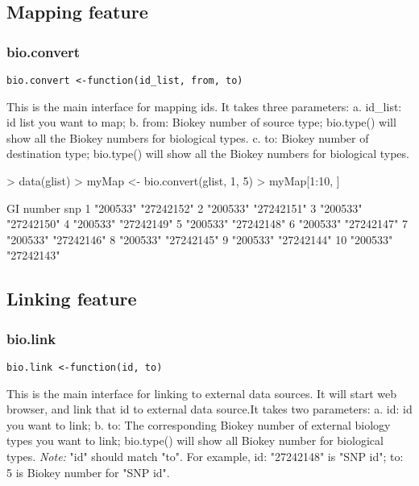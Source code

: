 \documentclass[a4paper]{article}
\begin{document}
\subsection{Mapping feature}
\subsubsection{bio.convert}
\begin{verbatim}
bio.convert <-function(id_list, from, to)
\end{verbatim}
This is the main interface for mapping ids.
It takes three parameters: \newline
a. id\_list: id list you want to map; \newline 
b. from: Biokey number of source type; bio.type() will show all the Biokey numbers for biological types. \newline
c. to: Biokey number of destination type; bio.type() will show all the Biokey numbers for biological types.\newline

\begin{Schunk}
\begin{Sinput}
> data(glist)
> myMap <- bio.convert(glist, 1, 5)
> myMap[1:10, ]
\end{Sinput}
\begin{Soutput}
   GI number snp       
1  "200533"  "27242152"
2  "200533"  "27242151"
3  "200533"  "27242150"
4  "200533"  "27242149"
5  "200533"  "27242148"
6  "200533"  "27242147"
7  "200533"  "27242146"
8  "200533"  "27242145"
9  "200533"  "27242144"
10 "200533"  "27242143"
\end{Soutput}
\end{Schunk}

\subsection{Linking feature}
\subsubsection{bio.link}

\begin{verbatim}
bio.link <-function(id, to)
\end{verbatim}
This is the main interface for linking to external data sources. 
It will start web browser, and link that id to external data source.\linebreak[2]
It takes two parameters: \newline
a. id: id you want to link;  \newline
b. to: The corresponding Biokey number of external biology types you want to link; bio.type() will show all Biokey number for biological types. \newline
\textit{Note:} \newline 
"id" should match "to". For example, id: "27242148" is "SNP id"; to: 5 is Biokey number for "SNP id".
\end{document}
